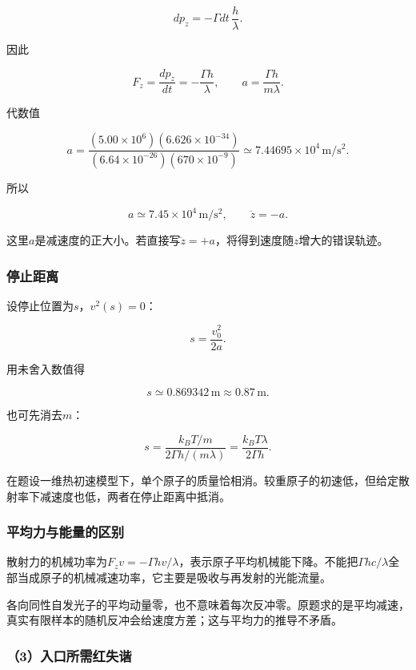 \documentclass[12pt,a4paper,fontset=fandol]{ctexart}
\begin{document}
\[
dp_z=-\Gamma dt\,\frac h\lambda.
\]

因此

\[
F_z=\frac{dp_z}{dt}=-\frac{\Gamma h}{\lambda},
\qquad
\boxed{a=\frac{\Gamma h}{m\lambda}}.
\]

代数值

\[
a=\frac{(5.00\times10^6)(6.626\times10^{-34})}
{(6.64\times10^{-26})(670\times10^{-9})}
\simeq7.44695\times10^4\,\mathrm{m/s^2}.
\]

所以

\[
\boxed{a\simeq7.45\times10^4\,\mathrm{m/s^2}},
\qquad \ddot z=-a.
\]

这里\(a\)是减速度的正大小。若直接写\(\ddot z=+a\)，将得到速度随\(z\)增大的错误轨迹。

\subsubsection{停止距离}\label{ux505cux6b62ux8dddux79bb}

设停止位置为\(s\)，\(v^2(s)=0\)：

\[
\boxed{s=\frac{v_0^2}{2a}}.
\]

用未舍入数值得

\[
s\simeq0.869342\,\mathrm m\approx0.87\,\mathrm m.
\]

也可先消去\(m\)：

\[
s=\frac{k_BT/m}{2\Gamma h/(m\lambda)}
=\frac{k_BT\lambda}{2\Gamma h}.
\]

在题设一维热初速模型下，单个原子的质量恰相消。较重原子的初速低，但给定散射率下减速度也低，两者在停止距离中抵消。

\subsubsection{平均力与能量的区别}\label{ux5e73ux5747ux529bux4e0eux80fdux91cfux7684ux533aux522b}

散射力的机械功率为\(F_zv=-\Gamma h v/\lambda\)，表示原子平均机械能下降。不能把\(\Gamma hc/\lambda\)全部当成原子的机械减速功率，它主要是吸收与再发射的光能流量。

各向同性自发光子的平均动量零，也不意味着每次反冲零。原题求的是平均减速，真实有限样本的随机反冲会给速度方差；这与平均力的推导不矛盾。

\subsubsection{（3）入口所需红失谐}\label{ux5165ux53e3ux6240ux9700ux7ea2ux5931ux8c10}
\end{document}
